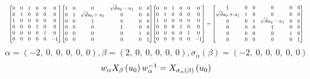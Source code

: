 \documentclass[11pt]{article}
\theoremstyle{definition}
\begin{document}
\[
\scaletoalign{\textwidth}{{\left[\begin{matrix}0 & 0 & 1 & 0 & 0 & 0\\0 & 1 & 0 & 0 & 0 & 0\\1 & 0 & 0 & 0 & 0 & 0\\0 & 0 & 0 & 1 & 0 & 0\\0 & 0 & 0 & 0 & 1 & 0\\0 & 0 & 0 & 0 & 0 & -1\end{matrix}\right]} {\left[\begin{matrix}1 & 0 & 0 & \sqrt{d} u_{0} - u_{1} & 0 & 0\\0 & 1 & \sqrt{d} u_{0} + u_{1} & 0 & 0 & 0\\0 & 0 & 1 & 0 & 0 & 0\\0 & 0 & 0 & 1 & 0 & 0\\0 & 0 & 0 & 0 & 1 & 0\\0 & 0 & 0 & 0 & 0 & 1\end{matrix}\right]} {\left[\begin{matrix}0 & 0 & 1 & 0 & 0 & 0\\0 & 1 & 0 & 0 & 0 & 0\\1 & 0 & 0 & 0 & 0 & 0\\0 & 0 & 0 & 1 & 0 & 0\\0 & 0 & 0 & 0 & 1 & 0\\0 & 0 & 0 & 0 & 0 & -1\end{matrix}\right]} = {\left[\begin{matrix}1 & 0 & 0 & 0 & 0 & 0\\\sqrt{d} u_{0} + u_{1} & 1 & 0 & 0 & 0 & 0\\0 & 0 & 1 & \sqrt{d} u_{0} - u_{1} & 0 & 0\\0 & 0 & 0 & 1 & 0 & 0\\0 & 0 & 0 & 0 & 1 & 0\\0 & 0 & 0 & 0 & 0 & 1\end{matrix}\right]}}
\]
\[
\alpha = \left( -2, \  0, \  0, \  0, \  0, \  0\right), \beta = \left( 2, \  0, \  0, \  0, \  0, \  0\right), \sigma_{\alpha}(\beta) = \left( -2, \  0, \  0, \  0, \  0, \  0\right)
\]
\[
\scaletoalign{\textwidth}{w_{\alpha} X_{\beta}\left(u_{0}\right) w_{\alpha}^{-1} = X_{\sigma_{\alpha}\left(\beta\right)}\left(u_{0}\right)}
\]
\end{document}
